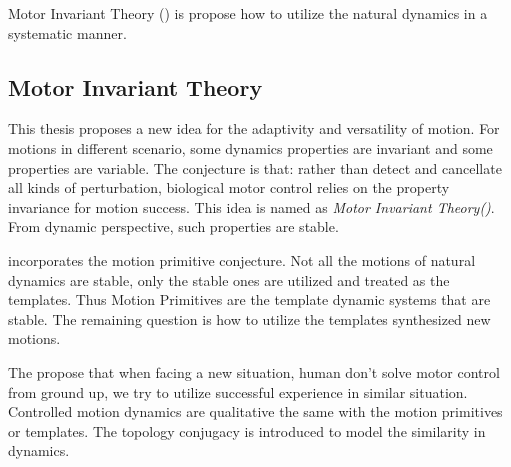 Motor Invariant Theory (\moit) is  propose  how to utilize the natural dynamics in a systematic manner.








\subsection{Motor Invariant Theory}
%
%
%





This thesis proposes a new idea for the adaptivity and versatility of motion.
For motions in different scenario, some dynamics properties are invariant and some properties are variable.
The conjecture is that: rather than detect and cancellate all kinds of perturbation, biological motor control relies on the property invariance for motion success.
This idea is named as \emph{Motor Invariant Theory(\moit)}.
From dynamic perspective, such properties are stable.

\moit incorporates the motion primitive conjecture. 
Not all the motions of natural dynamics are stable, only the stable ones are utilized and treated as the templates.
Thus Motion Primitives are the template dynamic systems that are stable.
The remaining question is how to utilize the templates synthesized new motions.

The \moit propose that when facing a new situation, human don't solve motor control from ground up,
we try to utilize  successful experience in similar situation.
Controlled motion dynamics are qualitative the same with the motion primitives or templates.
The topology conjugacy is introduced to model the similarity in dynamics.

